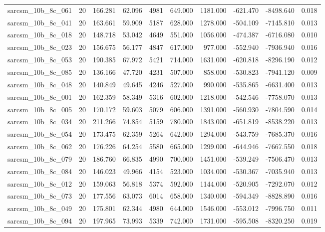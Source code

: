 \begin{tabular}{lrrrrrrrrr}
sarcsm\_10b\_8c\_061 & 20 & 166.281 & 62.096 & 4981 & 649.000 & 1181.000 & -621.470 & -8498.640 & 0.018 \\
sarcsm\_10b\_8c\_041 & 20 & 163.661 & 59.909 & 5187 & 628.000 & 1278.000 & -504.109 & -7145.810 & 0.013 \\
sarcsm\_10b\_8c\_018 & 20 & 148.718 & 53.042 & 4649 & 551.000 & 1056.000 & -474.387 & -6716.080 & 0.010 \\
sarcsm\_10b\_8c\_023 & 20 & 156.675 & 56.177 & 4847 & 617.000 & 977.000 & -552.940 & -7936.940 & 0.016 \\
sarcsm\_10b\_8c\_053 & 20 & 190.385 & 67.972 & 5421 & 714.000 & 1631.000 & -620.818 & -8296.190 & 0.012 \\
sarcsm\_10b\_8c\_085 & 20 & 136.166 & 47.720 & 4231 & 507.000 & 858.000 & -530.823 & -7941.120 & 0.009 \\
sarcsm\_10b\_8c\_048 & 20 & 140.849 & 49.645 & 4246 & 527.000 & 990.000 & -535.865 & -6631.400 & 0.013 \\
sarcsm\_10b\_8c\_001 & 20 & 162.359 & 58.349 & 5316 & 602.000 & 1218.000 & -542.546 & -7758.070 & 0.013 \\
sarcsm\_10b\_8c\_005 & 20 & 170.172 & 59.603 & 5079 & 606.000 & 1391.000 & -560.930 & -7804.590 & 0.014 \\
sarcsm\_10b\_8c\_034 & 20 & 211.266 & 74.854 & 5159 & 780.000 & 1843.000 & -651.819 & -8538.220 & 0.013 \\
sarcsm\_10b\_8c\_054 & 20 & 173.475 & 62.359 & 5264 & 642.000 & 1294.000 & -543.759 & -7685.370 & 0.016 \\
sarcsm\_10b\_8c\_062 & 20 & 176.226 & 64.254 & 5580 & 665.000 & 1299.000 & -644.946 & -7667.550 & 0.018 \\
sarcsm\_10b\_8c\_079 & 20 & 186.760 & 66.835 & 4990 & 700.000 & 1451.000 & -539.249 & -7506.470 & 0.013 \\
sarcsm\_10b\_8c\_084 & 20 & 146.023 & 49.966 & 4154 & 523.000 & 1034.000 & -530.367 & -7035.940 & 0.013 \\
sarcsm\_10b\_8c\_012 & 20 & 159.063 & 56.818 & 5374 & 592.000 & 1144.000 & -520.905 & -7292.070 & 0.012 \\
sarcsm\_10b\_8c\_073 & 20 & 177.556 & 63.073 & 6014 & 658.000 & 1340.000 & -594.349 & -8828.890 & 0.016 \\
sarcsm\_10b\_8c\_049 & 20 & 175.801 & 62.344 & 4980 & 644.000 & 1546.000 & -553.012 & -7996.750 & 0.011 \\
sarcsm\_10b\_8c\_094 & 20 & 197.965 & 73.993 & 5339 & 742.000 & 1731.000 & -595.508 & -8320.250 & 0.019 \\

\end{tabular}
